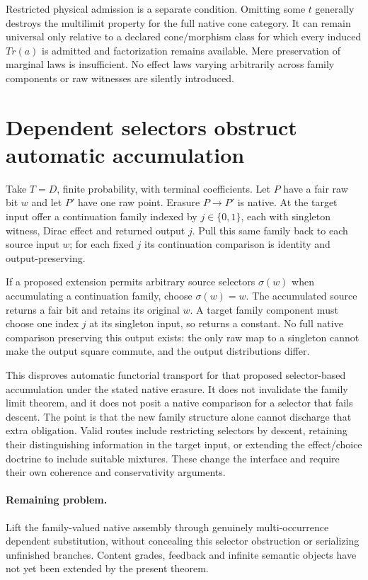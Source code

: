 \documentclass[11pt]{article}
\begin{document}
Restricted physical admission is a separate condition. Omitting some $t$ generally destroys the multilimit property for the full native cone category. It can remain universal only relative to a declared cone/morphism class for which every induced $Tr(a)$ is admitted and factorization remains available. Mere preservation of marginal laws is insufficient. No effect laws varying arbitrarily across family components or raw witnesses are silently introduced.

\section{Dependent selectors obstruct automatic accumulation}
Take $T=D$, finite probability, with terminal coefficients. Let $P$ have a fair raw bit $w$ and let $P'$ have one raw point. Erasure $P\to P'$ is native. At the target input offer a continuation family indexed by $j\in\{0,1\}$, each with singleton witness, Dirac effect and returned output $j$. Pull this same family back to each source input $w$; for each fixed $j$ its continuation comparison is identity and output-preserving.

If a proposed extension permits arbitrary source selectors $\sigma(w)$ when accumulating a continuation family, choose $\sigma(w)=w$. The accumulated source returns a fair bit and retains its original $w$. A target family component must choose one index $j$ at its singleton input, so returns a constant. No full native comparison preserving this output exists: the only raw map to a singleton cannot make the output square commute, and the output distributions differ.

This disproves automatic functorial transport for that proposed selector-based accumulation under the stated native erasure. It does not invalidate the family limit theorem, and it does not posit a native comparison for a selector that fails descent. The point is that the new family structure alone cannot discharge that extra obligation. Valid routes include restricting selectors by descent, retaining their distinguishing information in the target input, or extending the effect/choice doctrine to include suitable mixtures. These change the interface and require their own coherence and conservativity arguments.

\paragraph{Remaining problem.}
Lift the family-valued native assembly through genuinely multi-occurrence dependent substitution, without concealing this selector obstruction or serializing unfinished branches. Content grades, feedback and infinite semantic objects have not yet been extended by the present theorem.
\end{document}
